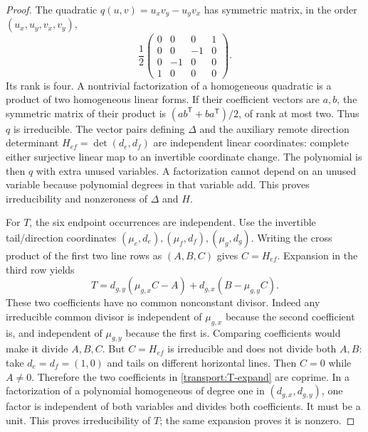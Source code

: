 \begin{proof}\leanok
The quadratic $q(u,v)=u_xv_y-u_yv_x$ has symmetric matrix, in the order
$(u_x,u_y,v_x,v_y)$,
\begin{equation}\label{transport:qmatrix}
 \frac12\begin{pmatrix}0&0&0&1\\0&0&-1&0\\0&-1&0&0\\1&0&0&0\end{pmatrix}.
\end{equation}
Its rank is four. A nontrivial factorization of a homogeneous quadratic is
a product of two homogeneous linear forms. If their coefficient vectors are
$a,b$, the symmetric matrix of their product is
$(ab^{\mathsf T}+ba^{\mathsf T})/2$, of rank at most two. Thus $q$ is
irreducible. The vector pairs defining $\Delta$ and the auxiliary remote
direction determinant $H_{ef}=\det(d_e,d_f)$ are independent linear coordinates:
complete either surjective linear map to an invertible coordinate change.
The polynomial is then $q$ with extra unused variables. A factorization cannot
depend on an unused variable because polynomial degrees in that variable add.
This proves irreducibility and nonzeroness of $\Delta$ and $H$.

For $T$, the six endpoint occurrences are independent. Use the invertible
tail/direction coordinates $(\mu_e,d_e),(\mu_f,d_f),(\mu_g,d_g)$.
Writing the cross product of the first two line rows as $(A,B,C)$ gives
$C=H_{ef}$. Expansion in the third row yields
\begin{equation}\label{transport:T-expand}
 T=d_{g,y}(\mu_{g,x}C-A)+d_{g,x}(B-\mu_{g,y}C).
\end{equation}
These two coefficients have no common nonconstant divisor. Indeed any
irreducible common divisor is independent of $\mu_{g,x}$ because the second
coefficient is, and independent of $\mu_{g,y}$ because the first is.
Comparing coefficients would make it divide $A,B,C$. But $C=H_{ef}$ is
irreducible and does not divide both $A,B$: take $d_e=d_f=(1,0)$ and tails on
different horizontal lines. Then $C=0$ while $A\ne0$. Therefore the two
coefficients in \eqref{transport:T-expand} are coprime. In a factorization
of a polynomial homogeneous of degree one in $(d_{g,x},d_{g,y})$, one factor
is independent of both variables and divides both coefficients. It must be
a unit. This proves irreducibility of $T$; the same expansion proves it is
nonzero.


\end{proof}
